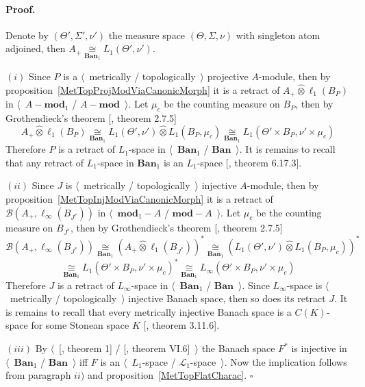 \documentclass[12pt]{article}
\newcommand{\projtens}{\mathbin{\widehat{\otimes}}}
\newcommand{\isom}[1]{\mathop{\mathbin{\cong}}\limits_{#1}}
\renewenvironment{proof}{\paragraph{Proof.}}{\hfill$\square$\medskip}
\begin{document}
\begin{proof}

    Denote by $(\Theta',\Sigma',\nu')$ the measure space $(\Theta,\Sigma,\nu)$
    with singleton atom adjoined, then $A_+\isom{\mathbf{Ban}_1}
        L_1(\Theta',\nu')$.

    $(i)$ Since $P$ is a $\langle$~metrically / topologically~$\rangle$
    projective $A$-module, then by
    proposition~\ref{MetTopProjModViaCanonicMorph} it is a retract of
    $A_+\projtens \ell_1(B_P)$ in 
    $\langle$~$A-\mathbf{mod}_1$ / $A-\mathbf{mod}$~$\rangle$. Let
    $\mu_c$ be the counting measure on $B_P$, then by Grothendieck's theorem
        [\cite{HelLectAndExOnFuncAn}, theorem 2.7.5]
    $$
        A_+\projtens\ell_1(B_P)
        \isom{\mathbf{Ban}_1}L_1(\Theta',\nu')\projtens L_1(B_P,\mu_c)
        \isom{\mathbf{Ban}_1}L_1(\Theta'\times B_P,\nu'\times \mu_c)
    $$
    Therefore $P$ is a retract of $L_1$-space in $\langle$~$\mathbf{Ban}_1$ /
    $\mathbf{Ban}$~$\rangle$. It is remains to recall that any retract of
    $L_1$-space in $\mathbf{Ban}_1$ is an $L_1$-space
    [\cite{LaceyIsomThOfClassicBanSp}, theorem 6.17.3].

    $(ii)$ Since $J$ is $\langle$~metrically / topologically~$\rangle$ injective
    $A$-module, then by proposition~\ref{MetTopInjModViaCanonicMorph} it is a
    retract of $\mathcal{B}(A_+,\ell_\infty(B_{J^*}))$ in 
    $\langle$~$\mathbf{mod}_1-A$ / $\mathbf{mod}-A$~$\rangle$. 
    Let $\mu_c$ be the counting measure on $B_{J^*}$, then
    by Grothendieck's theorem [\cite{HelLectAndExOnFuncAn}, theorem 2.7.5]
    $$
        \mathcal{B}(A_+,\ell_\infty(B_{J^*}))
        \isom{\mathbf{Ban}_1}{(A_+\projtens \ell_1(B_{J^*}))}^*
        \isom{\mathbf{Ban}_1}{(L_1(\Theta',\nu')\projtens L_1(B_P,\mu_c))}^*
    $$
    $$
        \isom{\mathbf{Ban}_1}{L_1(\Theta'\times B_P,\nu'\times \mu_c)}^*
        \isom{\mathbf{Ban}_1}L_\infty(\Theta'\times B_P,\nu'\times \mu_c)
    $$
    Therefore $J$ is a retract of $L_\infty$-space in $\langle$~$\mathbf{Ban}_1$
    / $\mathbf{Ban}$~$\rangle$. Since $L_\infty$-space is $\langle$~metrically /
    topologically~$\rangle$ injective Banach space, then so does its retract
    $J$. It is remains to recall that every metrically injective Banach space is
    a $C(K)$-space for some Stonean space $K$ [\cite{LaceyIsomThOfClassicBanSp},
            theorem 3.11.6].

    $(iii)$  By $\langle$~[\cite{GrothMetrProjFlatBanSp}, theorem 1] /
    [\cite{StegRethNucOpL1LInfSp}, theorem VI.6]~$\rangle$ the Banach space
    $F^*$ is injective in $\langle$~$\mathbf{Ban}_1$ / $\mathbf{Ban}$~$\rangle$
    iff $F$ is an $\langle$~$L_1$-space / $\mathscr{L}_1$-space~$\rangle$. Now
    the implication follows from paragraph $ii)$ and
    proposition~\ref{MetTopFlatCharac}.
\end{proof}
\end{document}
